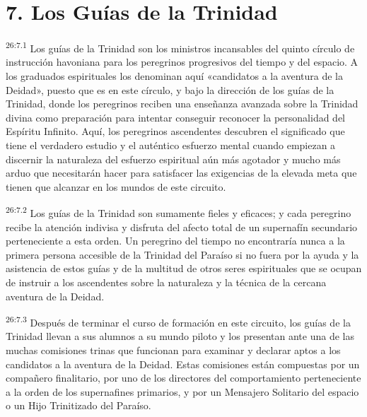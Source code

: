 \section*{7. Los Guías de la Trinidad}
\par
\textsuperscript{26:7.1} Los guías de la Trinidad son los ministros incansables del quinto círculo de instrucción havoniana para los peregrinos progresivos del tiempo y del espacio. A los graduados espirituales los denominan aquí «candidatos a la aventura de la Deidad», puesto que es en este círculo, y bajo la dirección de los guías de la Trinidad, donde los peregrinos reciben una enseñanza avanzada sobre la Trinidad divina como preparación para intentar conseguir reconocer la personalidad del Espíritu Infinito. Aquí, los peregrinos ascendentes descubren el significado que tiene el verdadero estudio y el auténtico esfuerzo mental cuando empiezan a discernir la naturaleza del esfuerzo espiritual aún más agotador y mucho más arduo que necesitarán hacer para satisfacer las exigencias de la elevada meta que tienen que alcanzar en los mundos de este circuito.

\par
\textsuperscript{26:7.2} Los guías de la Trinidad son sumamente fieles y eficaces; y cada peregrino recibe la atención indivisa y disfruta del afecto total de un supernafín secundario perteneciente a esta orden. Un peregrino del tiempo no encontraría nunca a la primera persona accesible de la Trinidad del Paraíso si no fuera por la ayuda y la asistencia de estos guías y de la multitud de otros seres espirituales que se ocupan de instruir a los ascendentes sobre la naturaleza y la técnica de la cercana aventura de la Deidad.

\par
\textsuperscript{26:7.3} Después de terminar el curso de formación en este circuito, los guías de la Trinidad llevan a sus alumnos a su mundo piloto y los presentan ante una de las muchas comisiones trinas que funcionan para examinar y declarar aptos a los candidatos a la aventura de la Deidad. Estas comisiones están compuestas por un compañero finalitario, por uno de los directores del comportamiento perteneciente a la orden de los supernafines primarios, y por un Mensajero Solitario del espacio o un Hijo Trinitizado del Paraíso.

